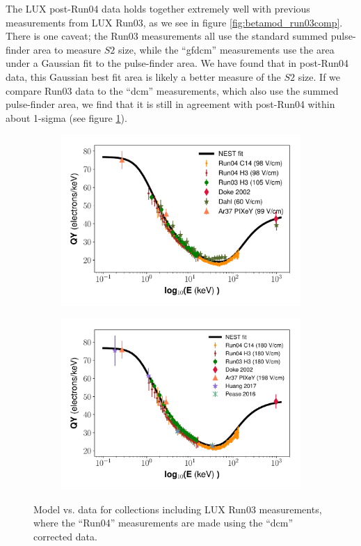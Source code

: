 The LUX post-Run04 data holds together extremely well with previous measurements from LUX Run03, as we see in figure \ref{fig:betamod_run03comp}. There is one caveat; the Run03 measurements all use the standard summed pulse-finder area to measure $S2$ size, while the ``gfdcm'' measurements use the area under a Gaussian fit to the pulse-finder area. We have found that in post-Run04 data, this Gaussian best fit area is likely a better measure of the $S2$ size. If we compare Run03 data to the ``dcm'' measurements, which also use the summed pulse-finder area, we find that it is still in agreement with post-Run04 within about 1-sigma (see figure \ref{fig:betamod_run03comp_dcm}).
\begin{figure}[!h]
\centering
\begin{subfigure}{0.5\linewidth}
\includegraphics[width=\linewidth]{Figures/Yields_fit_new/NEST_fit_98Vcm_new_dcm.pdf}
\caption{}
\end{subfigure}%
\begin{subfigure}{0.5\linewidth}
\includegraphics[width=\linewidth]{Figures/Yields_fit_new/NEST_fit_180Vcm_new_dcm.pdf}
\caption{}
\end{subfigure}
\caption{Model vs. data for collections including LUX Run03 measurements, where the ``Run04'' measurements are made using the ``dcm'' corrected data.}
\label{fig:betamod_run03comp_dcm}
\end{figure}

